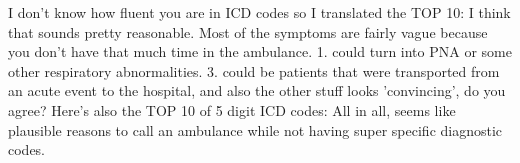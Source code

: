 I don't know how fluent you are in ICD codes so I translated the TOP 10:\markdownRendererInterblockSeparator
{}\markdownRendererInterblockSeparator
{}I think that sounds pretty reasonable. Most of the symptoms are fairly vague because you don't have that much time in the ambulance. 1. could turn into PNA or some other respiratory abnormalities. 3. could be patients that were transported from an acute event to the hospital, and also the other stuff looks 'convincing', do you agree?\markdownRendererInterblockSeparator
{}Here's also the TOP 10 of 5 digit ICD codes:\markdownRendererInterblockSeparator
{}\markdownRendererInterblockSeparator
{}All in all, seems like plausible reasons to call an ambulance while not having super specific diagnostic codes.\relax